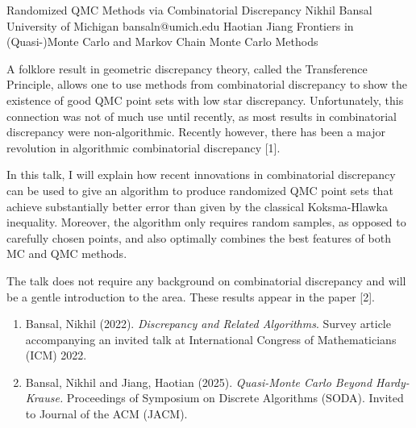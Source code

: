 \begin{talk}
  {Randomized QMC Methods via Combinatorial Discrepancy}%
  {Nikhil Bansal}%
  {University of Michigan}%
  {bansaln@umich.edu}%
  {Haotian Jiang}%
  {Frontiers in (Quasi-)Monte Carlo and Markov Chain Monte Carlo Methods}%
    

A folklore result in geometric discrepancy theory, called the Transference Principle, allows one to use methods from combinatorial discrepancy to show the existence of good QMC point sets with low star discrepancy.
Unfortunately, this connection was not of much use until recently, as most results in combinatorial discrepancy were non-algorithmic. Recently however, there has been a major revolution in algorithmic combinatorial discrepancy [1]. 

In this talk, I will explain how recent innovations in combinatorial discrepancy can be used to give an algorithm to produce randomized QMC point sets that  achieve substantially better error than given by the classical Koksma-Hlawka inequality. Moreover, the algorithm only requires random samples, as opposed to carefully chosen points, and also optimally combines the best features of both MC and QMC methods.  

 

The talk does not require any background on combinatorial discrepancy and will be a gentle introduction to the area. 
These results appear in the paper [2].

\medskip

\begin{enumerate}
 \item[{[1]}] Bansal, Nikhil (2022). {\it Discrepancy and Related Algorithms}. Survey article accompanying an invited talk at 
     International Congress of Mathematicians (ICM) 2022.
     
 \item[{[2]}]  Bansal, Nikhil and Jiang, Haotian (2025). {\em Quasi-Monte Carlo Beyond Hardy-Krause.} Proceedings of Symposium on Discrete Algorithms (SODA). Invited to Journal of the ACM (JACM). 
\end{enumerate}
\end{talk}

